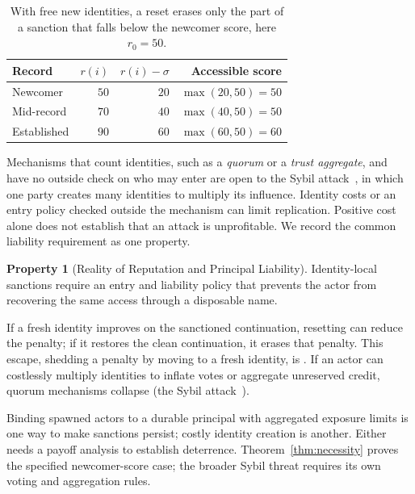 \documentclass[11pt,a4paper]{article}
\theoremstyle{definition}
\newtheorem{property}{Property}[section]
\begin{document}
\begin{table}[H]
\centering\small\renewcommand{\arraystretch}{1.25}
\begin{tabularx}{\textwidth}{@{}>{\raggedright\arraybackslash}X r r r@{}}
\toprule
\textbf{Record} & $r(i)$ & $r(i)-\sigma$ & \textbf{Accessible score} \\
\midrule
Newcomer & $50$ & $20$ & $\max(20,50)=50$ \\
Mid-record & $70$ & $40$ & $\max(40,50)=50$ \\
Established & $90$ & $60$ & $\max(60,50)=60$ \\
\bottomrule
\end{tabularx}
\caption{With free new identities, a reset erases only the part of a sanction
that falls below the newcomer score, here $r_0=50$.}
\label{tab:necessity-numbers}
\end{table}


\noindent Mechanisms that count identities, such as a \emph{quorum} or a
\emph{trust aggregate}, and have no outside check on who may enter are open to
the Sybil attack~, in which one party creates many
identities to multiply its influence. Identity costs or an entry policy checked
outside the mechanism can limit replication.
Positive cost alone does not establish that an attack is unprofitable. We
record the common liability requirement as one property.

\begin{property}[Reality of Reputation and Principal \mbox{Liability}]\label{prop:reality}
\setlength{\parskip}{4pt plus 1pt}
Identity-local sanctions require an entry and liability policy that
prevents the actor from recovering the same access through a disposable name.

If a fresh identity improves on the sanctioned continuation, resetting can
reduce the penalty; if it restores the clean continuation, it erases that
penalty. This escape, shedding a penalty by moving to a fresh identity, is . If an actor can costlessly multiply identities to inflate votes or aggregate unreserved credit, quorum mechanisms collapse (the Sybil attack~).

Binding spawned actors to a durable principal with aggregated exposure limits is one way to make sanctions persist; costly identity creation is another. Either needs a payoff analysis to establish deterrence. Theorem~\ref{thm:necessity} proves the specified newcomer-score
case; the broader Sybil threat requires its own voting and aggregation rules.
\end{property}
\end{document}
